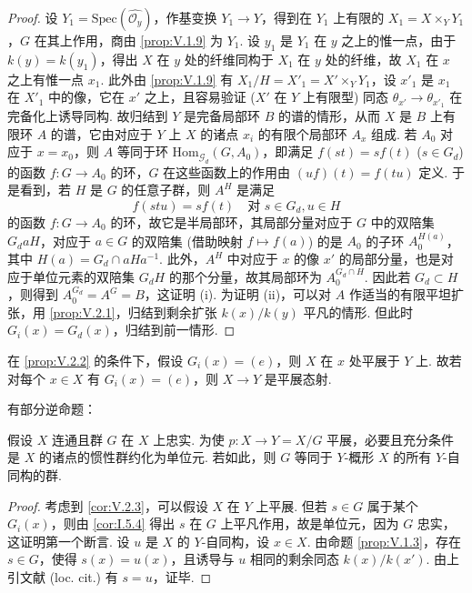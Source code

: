 \begin{proof}
设 $Y_1 = \mathrm{Spec}(\widehat{\mathcal{O}_y})$，作基变换 $Y_1 \to Y$，得到在 $Y_1$ 上有限的 $X_1 = X \times_Y Y_1$，$G$ 在其上作用，商由 \ref{prop:V.1.9} 为 $Y_1$. 设 $y_1$ 是 $Y_1$ 在 $y$ 之上的惟一点，由于 $k(y) = k(y_1)$，得出 $X$ 在 $y$ 处的纤维同构于 $X_1$ 在 $y$ 处的纤维，故 $X_1$ 在 $x$ 之上有惟一点 $x_1$. 此外由 \ref{prop:V.1.9} 有 $X_1/H = X'_1 = X' \times_Y Y_1$，设 $x'_1$ 是 $x_1$ 在 $X'_1$ 中的像，它在 $x'$ 之上，且容易验证 ($X'$ 在 $Y$ 上有限型) 同态 $\theta_{x'} \to \theta_{x'_1}$ 在完备化上诱导同构. 故归结到 $Y$ 是完备局部环 $B$ 的谱的情形，从而 $X$ 是 $B$ 上有限环 $A$ 的谱，它由对应于 $Y$ 上 $X$ 的诸点 $x_i$ 的有限个局部环 $A_x$ 组成. 若 $A_0$ 对应于 $x = x_0$，则 $A$ 等同于环 $\mathrm{Hom}_{\mathcal{G}_d}(G, A_0)$，即满足 $f(st) = sf(t)$ ($s \in G_d$) 的函数 $f \colon G \to A_0$ 的环，$G$ 在这些函数上的作用由 $(uf)(t) = f(tu)$ 定义. 于是看到，若 $H$ 是 $G$ 的任意子群，则 $A^{H}$ 是满足
\[
f(stu) = sf(t) \quad \text{对 } s \in G_d, u \in H
\]
的函数 $f \colon G \to A_0$ 的环，故它是半局部环，其局部分量对应于 $G$ 中的双陪集 $G_d a H$，对应于 $a \in G$ 的双陪集 (借助映射 $f \mapsto f(a)$) 的是 $A_0$ 的子环 $A_0^{H(a)}$，其中 $H(a) = G_d \cap aHa^{-1}$. 此外，$A^{H}$ 中对应于 $x$ 的像 $x'$ 的局部分量，也是对应于单位元素的双陪集 $G_d H$ 的那个分量，故其局部环为 $A_0^{G_d \cap H}$. 因此若 $G_d \subset H$，则得到 $A_0^{G_d} = A^{G} = B$，这证明 (i). 为证明 (ii)，可以对 $A$ 作适当的有限平坦扩张，用 \ref{prop:V.2.1}，归结到剩余扩张 $k(x)/k(y)$ 平凡的情形. 但此时 $G_i(x) = G_d(x)$，归结到前一情形.
\end{proof}

\begin{corollary}\label{cor:V.2.3}
在 \ref{prop:V.2.2} 的条件下，假设 $G_i(x) = (e)$，则 $X$ 在 $x$ 处平展于 $Y$ 上. 故若对每个 $x \in X$ 有 $G_i(x) = (e)$，则 $X \to Y$ 是平展态射.
\end{corollary}

有部分逆命题：

\begin{corollary}\label{cor:V.2.4}
假设 $X$ 连通且群 $G$ 在 $X$ 上忠实. 为使 $p \colon X \to Y = X/G$ 平展，必要且充分条件是 $X$ 的诸点的惯性群约化为单位元. 若如此，则 $G$ 等同于 $Y$-概形 $X$ 的所有 $Y$-自同构的群.
\end{corollary}

\begin{proof}
考虑到 \ref{cor:V.2.3}，可以假设 $X$ 在 $Y$ 上平展. 但若 $s \in G$ 属于某个 $G_i(x)$，则由 \ref{cor:I.5.4} 得出 $s$ 在 $G$ 上平凡作用，故是单位元，因为 $G$ 忠实，这证明第一个断言. 设 $u$ 是 $X$ 的 $Y$-自同构，设 $x \in X$. 由命题 \ref{prop:V.1.3}，存在 $s \in G$，使得 $s(x) = u(x)$，且诱导与 $u$ 相同的剩余同态 $k(x)/k(x')$. 由上引文献 (loc. cit.) 有 $s = u$，证毕.
\end{proof}

